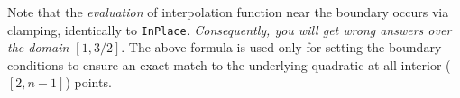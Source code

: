 \documentclass{article}
\begin{document}
Note that the \emph{evaluation} of interpolation function near the
boundary occurs via clamping, identically to \texttt{InPlace}.
\emph{Consequently, you will get wrong answers over the domain
$[1,3/2]$}.  The above formula is used only for setting the boundary
conditions to ensure an exact match to the underlying quadratic at
all interior ($[2,n-1]$) points.

\nocite{*}
\printbibliography
\end{document}
